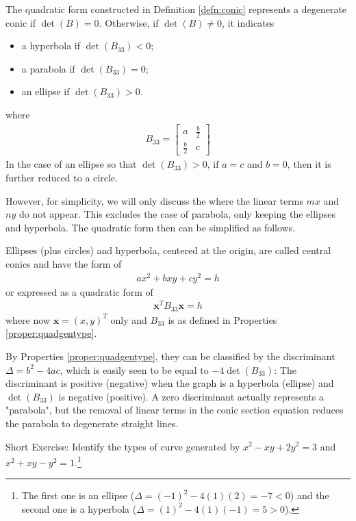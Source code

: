 \begin{proper}
\label{proper:quadgentype}
The quadratic form constructed in Definition \ref{defn:conic} represents a degenerate conic if $\det(B) = 0$. Otherwise, if $\det(B) \neq 0$, it indicates
\begin{itemize}
    \item a hyperbola if $\det(B_{33}) < 0$;
    \item a parabola if $\det(B_{33}) = 0$;
    \item an ellipse if $\det(B_{33}) > 0$.
\end{itemize}
where
\begin{align*}
B_{33} = 
\begin{bmatrix}
a & \frac{b}{2} \\
\frac{b}{2} & c 
\end{bmatrix}
\end{align*}
In the case of an ellipse so that $\det(B_{33}) > 0$, if $a = c$ and $b = 0$, then it is further reduced to a circle.
\end{proper}
However, for simplicity, we will only discuss the  where the linear terms $mx$ and $ny$ do not appear. This excludes the case of parabola, only keeping the ellipses and hyperbola. The quadratic form then can be simplified as follows.
\begin{proper}
\label{proper:quadcentraltype}
Ellipses (plus circles) and hyperbola, centered at the origin, are called central conics and have the form of
\begin{align*}
ax^2 + bxy + cy^2 = h
\end{align*}
or expressed as a quadratic form of
\begin{align*}
\textbf{x}^T B_{33} \textbf{x} = h
\end{align*}
where now $\textbf{x} = (x,y)^T$ only and $B_{33}$ is as defined in Properties \ref{proper:quadgentype}.
\end{proper}
By Properties \ref{proper:quadgentype}, they can be classified by the discriminant $\Delta = b^2 - 4ac$, which is easily seen to be equal to $-4\det(B_{33})$: The discriminant is positive (negative) when the graph is a hyperbola (ellipse) and $\det(B_{33})$ is negative (positive). A zero discriminant actually represents a "parabola", but the removal of linear terms in the conic section equation reduces the parabola to degenerate straight lines. \par
Short Exercise: Identify the types of curve generated by $x^2 - xy + 2y^2 = 3$ and $x^2 + xy - y^2 = 1$.\footnote{The first one is an ellipse ($\Delta = (-1)^2 - 4(1)(2) = -7 < 0$) and the second one is a hyperbola ($\Delta = (1)^2 - 4(1)(-1) = 5 > 0$).}\par
